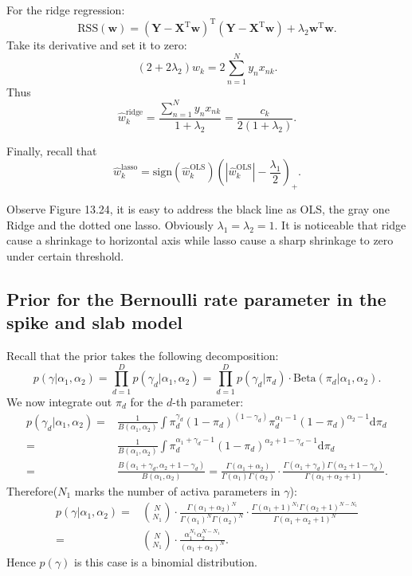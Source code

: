 \documentclass[UTF8]{ctexart}
\begin{document}
For the ridge regression:
$$\text{RSS}(\textbf{w})=(\textbf{Y}-\textbf{X}^{\text{T}}\textbf{w})^{\text{T}}(\textbf{Y}-\textbf{X}^{\text{T}}\textbf{w}) + \lambda_{2} \textbf{w}^{\text{T}}\textbf{w}.$$
Take its derivative and set it to zero:
$$(2+2\lambda_{2})w_{k} = 2\sum_{n=1}^{N}y_{n}x_{nk}.$$
Thus
$$\hat{w}_{k}^{\text{ridge}}=\frac{\sum_{n=1}^{N}y_{n}x_{nk}}{1+\lambda_{2}}=\frac{c_{k}}{2(1+\lambda_{2})}.$$

Finally, recall that
$$\hat{w}_{k}^{\text{lasso}}=\text{sign}(\hat{w}_{k}^{\text{OLS}})(|\hat{w}_{k}^{\text{OLS}}|-\frac{\lambda_{1}}{2})_{+}.$$

Observe Figure 13.24, it is easy to address the black line as OLS, the gray one Ridge and the dotted one lasso.
Obviously $\lambda_{1}=\lambda_{2}=1$.
It is noticeable that ridge cause a shrinkage to horizontal axis while lasso cause a sharp shrinkage to zero under certain threshold.

\subsection{Prior for the Bernoulli rate parameter in the spike and slab model}
Recall that the prior takes the following decomposition:
$$p(\gamma|\alpha_{1},\alpha_{2})=\prod_{d=1}^{D}p(\gamma_{d}|\alpha_{1},\alpha_{2})=\prod_{d=1}^{D}p(\gamma_{d}|\pi_{d})\cdot\text{Beta}(\pi_{d}|\alpha_{1},\alpha_{2}).$$
We now integrate out $\pi_{d}$ for the $d$-th parameter:
\begin{align}
p(\gamma_{d}|\alpha_{1},\alpha_{2})=&\frac{1}{B(\alpha_{1},\alpha_{2})}\int \pi_{d}^{\gamma_{d}}(1-\pi_{d})^{(1-\gamma_{d})}\pi_{d}^{\alpha_{1}-1}(1-\pi_{d})^{\alpha_{2}-1}\text{d}\pi_{d}\nonumber \\
=&\frac{1}{B(\alpha_{1},\alpha_{2})}\int \pi_{d}^{\alpha_{1}+\gamma_{d}-1}(1-\pi_{d})^{\alpha_{2}+1-\gamma_{d} - 1}\text{d}\pi_{d}\nonumber \\
=&\frac{B(\alpha_{1}+\gamma_{d},\alpha_{2}+1-\gamma_{d})}{B(\alpha_{1},\alpha_{2})}=\frac{\Gamma(\alpha_{1}+\alpha_{2})}{\Gamma(\alpha_{1})\Gamma(\alpha_{2})}\cdot \frac{\Gamma(\alpha_{1}+\gamma_{d})\Gamma(\alpha_{2}+1-\gamma_{d})}{\Gamma(\alpha_{1}+\alpha_{2}+1)}.\nonumber
\end{align}
Therefore($N_{1}$ marks the number of activa parameters in $\gamma$):
\begin{align}
p(\gamma|\alpha_{1},\alpha_{2})=&\binom{N}{N_{1}}\cdot\frac{\Gamma(\alpha_{1}+\alpha_{2})^{N}}{\Gamma(\alpha_{1})^{N}\Gamma(\alpha_{2})^{N}}\cdot\frac{\Gamma(\alpha_{1}+1)^{N_{1}}\Gamma(\alpha_{2}+1)^{N-N_{1}}}{\Gamma(\alpha_{1}+\alpha_{2}+1)^{N}}\nonumber \\
=&\binom{N}{N_{1}}\cdot\frac{\alpha_{1}^{N_{1}}\alpha_{2}^{N-N_{1}}}{(\alpha_{1}+\alpha_{2})^{N}}.\nonumber
\end{align}
Hence $p(\gamma)$ is this case is a binomial distribution.
\end{document}
